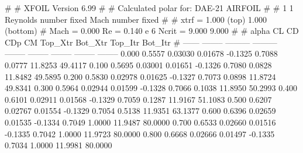 #  
#       XFOIL         Version 6.99
#  
# Calculated polar for: DAE-21 AIRFOIL                                  
#  
# 1 1 Reynolds number fixed          Mach number fixed         
#  
# xtrf =   1.000 (top)        1.000 (bottom)  
# Mach =   0.000     Re =     0.140 e 6     Ncrit =   9.000  9.000
#  
#   alpha    CL        CD       CDp       CM     Top_Xtr  Bot_Xtr  Top_Itr  Bot_Itr
#  ------ -------- --------- --------- -------- -------- -------- -------- --------
   0.000   0.5557   0.03030   0.01678  -0.1325   0.7088   0.0777  11.8253  49.4117
   0.100   0.5695   0.03001   0.01651  -0.1326   0.7080   0.0828  11.8482  49.5895
   0.200   0.5830   0.02978   0.01625  -0.1327   0.7073   0.0898  11.8724  49.8341
   0.300   0.5964   0.02944   0.01599  -0.1328   0.7066   0.1038  11.8950  50.2993
   0.400   0.6101   0.02911   0.01568  -0.1329   0.7059   0.1287  11.9167  51.1083
   0.500   0.6207   0.02767   0.01554  -0.1329   0.7054   0.5138  11.9351  63.1377
   0.600   0.6396   0.02659   0.01535  -0.1334   0.7049   1.0000  11.9487  80.0000
   0.700   0.6533   0.02660   0.01516  -0.1335   0.7042   1.0000  11.9723  80.0000
   0.800   0.6668   0.02666   0.01497  -0.1335   0.7034   1.0000  11.9981  80.0000

